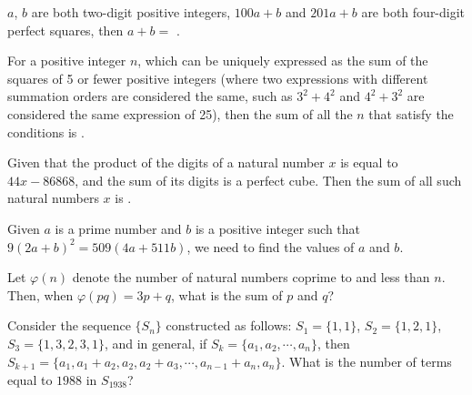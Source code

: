 \begin{problem}\label{Alg18}
	
$a $, $b$ are both two-digit positive integers, $100a+b$ and $201a+b$ are both four-digit perfect squares, then $a+b=$ \underline{\hspace{2cm}}.
	
	
\end{problem}


\begin{problem}\label{Alg19}
	
For a positive integer $n$, which can be uniquely expressed as the sum of the squares of 5 or fewer positive integers (where two expressions with different summation orders are considered the same, such as $3^2+4^2$ and $4^2+3^2$ are considered the same expression of 25), then the sum of all the $n$ that satisfy the conditions is \underline{\hspace{2cm}}.
	
	
\end{problem}



\begin{problem}\label{Alg20}
	
Given that the product of the digits of a natural number $x$ is equal to $44x-86868$, and the sum of its digits is a perfect cube. Then the sum of all such natural numbers $x$ is \underline{\hspace{2cm}}.
	
\end{problem}


\begin{problem}\label{Alg21}
Given \(a\) is a prime number and \(b\) is a positive integer such that \(9(2a+b)^2=509(4a+511b)\), we need to find the values of \(a\) and \(b\).
	
\end{problem}

\begin{problem}\label{Alg22}
Let $\varphi(n)$ denote the number of natural numbers coprime to and less than $n$. Then, when $\varphi(pq)=3p+q$, what is the sum of $p$ and $q$?
\end{problem}




\begin{problem}\label{Alg23}
Consider the sequence $\{S_n\}$ constructed as follows: $S_1=\{1,1\}$, $S_2=\{1,2,1\}$, $S_3=\{1,3,2,3,1\}$, and in general, if $S_k=\{a_1,a_2,\cdots,a_n\}$, then $S_{k+1}=\{a_1,a_1+a_2,a_2,a_2+a_3,\cdots,a_{n-1}+a_n,a_n\}$. What is the number of terms equal to $1988$ in $S_{1938}$?
\end{problem}



